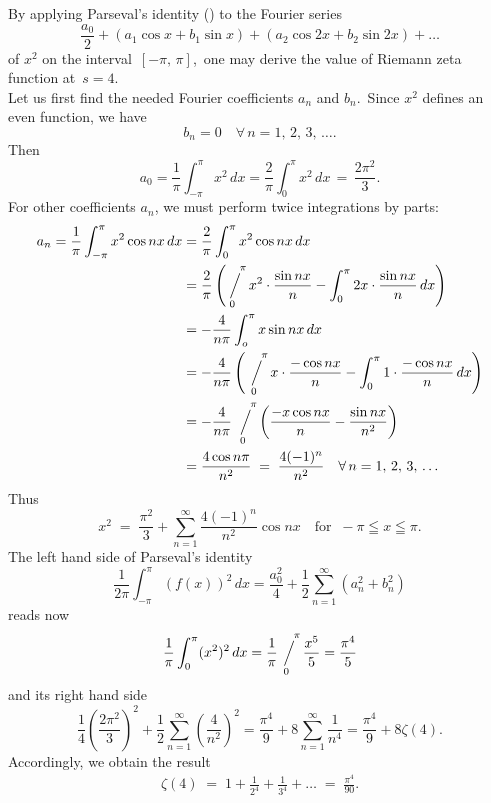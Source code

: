 \documentclass[12pt]{article}
\newcommand{\sijoitus}[2]%
{\operatornamewithlimits{\Big/}_{\!\!\!#1}^{\,#2}}
\begin{document}
By applying Parseval's identity () to the Fourier series
$$\frac{a_0}{2}+(a_1\cos{x}+b_1\sin{x})+(a_2\cos{2x}+b_2\sin{2x})+\ldots$$
of $x^2$ on the interval \,$[-\pi,\,\pi]$,\, one may derive the value of Riemann zeta function at\, $s = 4$.\\

Let us first find the needed Fourier coefficients $a_n$ and $b_n$.\, Since $x^2$ defines an even function, we have
$$b_n = 0 \quad \forall\, n = 1,\,2,\,3,\,\ldots.$$
Then
$$a_0 = \frac{1}{\pi}\int_{-\pi}^\pi x^2\,dx = \frac{2}{\pi}\int_0^\pi x^2\,dx \,=\, \frac{2\pi^2}{3}.$$
For other coefficients $a_n$, we must perform twice integrations by parts:
\begin{align*}
a_n = \frac{1}{\pi}\int_{-\pi}^\pi x^2\cos{nx}\,dx & = \frac{2}{\pi}\int_0^\pi x^2\cos{nx}\,dx\\ 
& = \frac{2}{\pi}\left(\!\sijoitus{0}{\quad\pi}x^2\cdot\frac{\sin{nx}}{n}-\int_0^\pi2x\cdot\frac{\sin{nx}}{n}\,dx\right)\\
& = -\frac{4}{n\pi}\int_o^\pi x\sin{nx}\,dx\\
& = -\frac{4}{n\pi}\left(\sijoitus{0}{\quad\pi}x\cdot\frac{-\cos{nx}}{n}
-\int_0^\pi 1\cdot\frac{-\cos{nx}}{n}\,dx\right)\\
& = -\frac{4}{n\pi}\sijoitus{0}{\quad\pi}\left(\frac{-x\cos{nx}}{n}-\frac{\sin{nx}}{n^2}\right)\\
& = \frac{4\cos{n\pi}}{n^2} \;=\; \frac{4(-1)^n}{n^2} \quad \forall\, n = 1,\,2,\,3,\,\ldots
\end{align*}
Thus
$$x^2 \;=\; \frac{\pi^2}{3}+\sum_{n=1}^\infty\frac{4(-1)^n}{n^2}\cos{nx}\quad \mbox{for}\;\; -\pi \leqq x \leqq \pi.$$
The left hand side of Parseval's identity 
$$\frac{1}{2\pi}\int_{-\pi}^\pi(f(x))^2\,dx = \frac{a_0^2}{4}+\frac{1}{2}\sum_{n=1}^\infty(a_n^2+b_n^2)$$
reads now
$$\frac{1}{\pi}\int_0^\pi(x^2)^2\,dx = \frac{1}{\pi}\!\sijoitus{0}{\quad\pi}\frac{x^5}{5} = \frac{\pi^4}{5}$$
and its right hand side
$$\frac{1}{4}\!\left(\frac{2\pi^2}{3}\right)^2+\frac{1}{2}\sum_{n=1}^\infty\left(\frac{4}{n^2}\right)^2
= \frac{\pi^4}{9}+8\sum_{n=1}^\infty\frac{1}{n^4} = \frac{\pi^4}{9}+8\zeta(4).$$
Accordingly, we obtain the result
\begin{align}
\zeta(4) \;=\; 1+\frac{1}{2^4}+\frac{1}{3^4}+\ldots \;=\; \frac{\pi^4}{90}.
\end{align}



\end{document}
